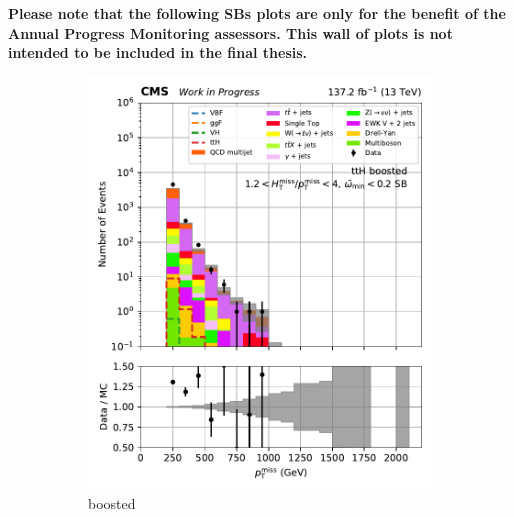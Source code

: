 \textbf{Please note that the following \glspl{SB} plots are only for the benefit of the Annual Progress Monitoring assessors. This wall of plots is not intended to be included in the final thesis.}

\begin{figure}[htbp]
    \centering
    \begin{subfigure}[b]{0.24\textwidth}
        \includegraphics[width=\textwidth]{figures/region_plots/2016to18/sideband_0/ttH_boosted.pdf}
        \caption{\ttH boosted}
    \end{subfigure}
    \hfill
    \begin{subfigure}[b]{0.24\textwidth}

\end{subfigure}
\end{figure}

